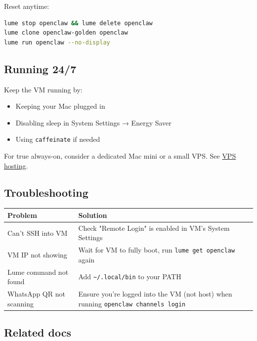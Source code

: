 Reset anytime:

\begin{lstlisting}[language=bash]
lume stop openclaw && lume delete openclaw
lume clone openclaw-golden openclaw
lume run openclaw --no-display
\end{lstlisting}


\hrulefill


\subsection{Running 24/7}


Keep the VM running by:

\begin{itemize}
  \item Keeping your Mac plugged in
  \item Disabling sleep in System Settings → Energy Saver
  \item Using \texttt{caffeinate} if needed
\end{itemize}


For true always-on, consider a dedicated Mac mini or a small VPS. See \href{/vps}{VPS hosting}.

\hrulefill


\subsection{Troubleshooting}



\begin{table}[h]
\centering
\small
\begin{tabular}{|l|l|}
\hline
Problem & Solution \\
\hline
Can't SSH into VM & Check "Remote Login" is enabled in VM's System Settings \\
\hline
VM IP not showing & Wait for VM to fully boot, run \texttt{lume get openclaw} again \\
\hline
Lume command not found & Add \texttt{\textasciitilde{}/.local/bin} to your PATH \\
\hline
WhatsApp QR not scanning & Ensure you're logged into the VM (not host) when running \texttt{openclaw channels login} \\
\hline
\end{tabular}
\end{table}



\hrulefill


\subsection{Related docs}


